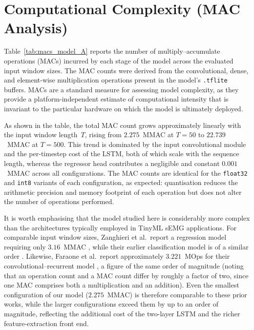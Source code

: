 \documentclass[12pt,DIV16,BCOR12mm,a4paper,footinclude=false,headinclude,parskip=half-,twoside,openright,cleardoublepage=empty,toc=index,bibliography=totoc,listof=totoc]{scrreprt}
\newcommand{\fittable}[1]{%
  \begingroup
  \sbox0{}%
  \ifdim\wd0>\textwidth
    \resizebox{\textwidth}{!}{\usebox0}%
  \else
    \usebox0%
  \fi
  \endgroup
}
\numberwithin{equation}{chapter}
\begin{document}
  \section{Computational Complexity (MAC Analysis)}

    \begin{table}[H]
      \centering
      \caption{Multiply--accumulate operations per model stage across input window sizes.}
      \label{tab:macs_model_A}
      \small
      \fittable{tables/macs/model_macs.tex}
    \end{table}

  Table~\ref{tab:macs_model_A} reports the number of multiply--accumulate operations
  (MACs) incurred by each stage of the model across the evaluated input window sizes.
  The MAC counts were derived from the convolutional, dense, and element-wise
  multiplication operations present in the model's \texttt{.tflite} buffers. MACs are a
  standard measure for assessing model complexity, as they provide a
  platform-independent estimate of computational intensity that is invariant to the
  particular hardware on which the model is ultimately deployed.

  As shown in the table, the total MAC count grows approximately linearly with the input
  window length~$T$, rising from $2.275$~MMAC at $T = 50$ to $22.739$~MMAC at $T = 500$.
  This trend is dominated by the input convolutional module and the per-timestep cost of
  the LSTM, both of which scale with the sequence length, whereas the regressor head
  contributes a negligible and constant $0.001$~MMAC across all configurations. The MAC
  counts are identical for the \texttt{float32} and \texttt{int8} variants of each
  configuration, as expected: quantisation reduces the arithmetic precision and memory
  footprint of each operation but does not alter the number of operations performed.

  It is worth emphasising that the model studied here is considerably more complex than
  the architectures typically employed in TinyML sEMG applications. For comparable input
  window sizes, Zanghieri et al.\ report a regression model requiring only $3.16$~MMAC
  \cite{zanghieriSEMGbasedRegressionHand2021}, while their earlier classification model
  is of a similar order \cite{zanghieriRobustRealTimeEmbedded2020}. Likewise, Faraone
  et al.\ report approximately $3.221$~MOps for their convolutional--recurrent model
  \cite{faraoneConvolutionalRecurrentNeuralNetworks2020}, a figure of the same order of
  magnitude (noting that an operation count and a MAC count differ by roughly a factor of
  two, since one MAC comprises both a multiplication and an addition). Even the smallest
  configuration of our model ($2.275$~MMAC) is therefore comparable to these prior works,
  while the larger configurations exceed them by up to an order of magnitude, reflecting
  the additional cost of the two-layer LSTM and the richer feature-extraction front end.
\end{document}
